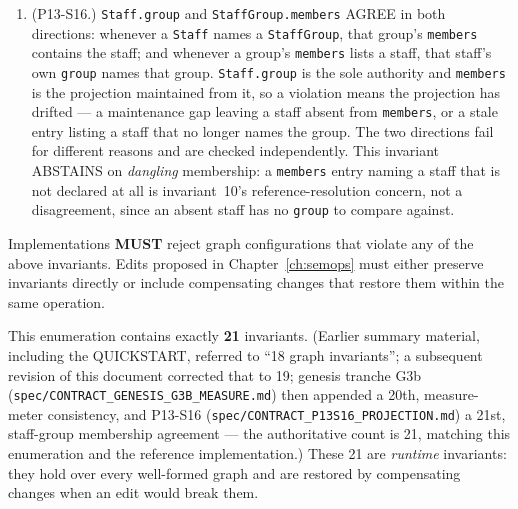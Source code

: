 \documentclass[11pt,letterpaper]{report}
\newcounter{requirement}[chapter]
\newcommand{\MUST}{\textbf{MUST}}
\begin{document}
\begin{requirement}
\begin{enumerate}
      this rule); this is deliberate abstention, not a soundness
      gap. A first measure has no predecessor, so only the BOUNDARY
      clause is vacuous for it; the AGREEMENT clause is not
      predecessor-dependent and still applies (unless
      \texttt{time\_signature} is \texttt{None} or agrees with the
      governing grid). A first measure may be a pickup, shorter
      than its bar: the second measure's distance from it may be
      any positive duration up to the governing signature's
      \texttt{measure\_duration()} (phase X3, P13-S19). Every later
      distance is a full bar; a short measure after the first is
      not modelled.
    \item (P13-S16.) \texttt{Staff.group} and
      \texttt{StaffGroup.members} AGREE in both directions:
      whenever a \texttt{Staff} names a \texttt{StaffGroup}, that
      group's \texttt{members} contains the staff; and whenever a
      group's \texttt{members} lists a staff, that staff's own
      \texttt{group} names that group. \texttt{Staff.group} is the
      sole authority and \texttt{members} is the projection
      maintained from it, so a violation means the projection has
      drifted --- a maintenance gap leaving a staff absent from
      \texttt{members}, or a stale entry listing a staff that no
      longer names the group. The two directions fail for different
      reasons and are checked independently. This invariant
      ABSTAINS on \emph{dangling} membership: a \texttt{members}
      entry naming a staff that is not declared at all is
      invariant~10's reference-resolution concern, not a
      disagreement, since an absent staff has no \texttt{group} to
      compare against.
  \end{enumerate}

  Implementations \MUST{} reject graph configurations that violate any
  of the above invariants. Edits proposed in Chapter~\ref{ch:semops}
  must either preserve invariants directly or include compensating
  changes that restore them within the same operation.
\end{requirement}

This enumeration contains exactly \textbf{21} invariants. (Earlier
summary material, including the QUICKSTART, referred to ``18 graph
invariants''; a subsequent revision of this document corrected that
to 19; genesis tranche G3b
(\texttt{spec/CONTRACT\_GENESIS\_G3B\_MEASURE.md}) then appended a
20th, measure-meter consistency, and P13-S16
(\texttt{spec/CONTRACT\_P13S16\_PROJECTION.md}) a 21st, staff-group
membership agreement --- the authoritative count is 21, matching this
enumeration and the reference implementation.)
These 21 are
\emph{runtime} invariants: they hold over every well-formed graph and
are restored by compensating changes when an edit would break them.
\end{document}
